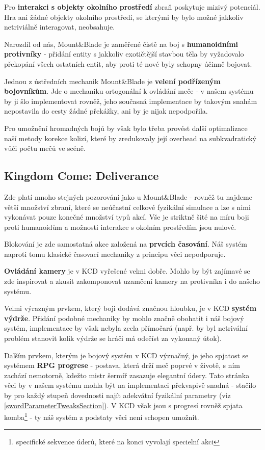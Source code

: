 Pro \textbf{interakci s objekty okolního prostředí} zbraň poskytuje mizivý potenciál. Hra ani žádné objekty okolního prostředí, se kterými by bylo možné jakkoliv netriviálně interagovat, neobsahuje.

Narozdíl od nás, Mount\&Blade je zaměřené čistě na boj s \textbf{humanoidními protivníky} - přidání entity s jakkoliv exotičtější stavbou těla by vyžadovalo překopání všech ostatních entit, aby proti té nové byly schopny účinně bojovat.


Jednou z ústředních mechanik Mount\&Blade je \textbf{velení podřízeným bojovníkům}. Jde o mechaniku ortogonální k ovládání meče - v našem systému by ji šlo implementovat rovněž, jeho současná implementace by takovým snahám nepostavila do cesty žádné překážky, ani by je nijak nepodpořila.

Pro umožnění hromadných bojů by však bylo třeba provést další optimalizace naší metody korekce kolizí, které by zredukovaly její overhead na subkvadratický vůči počtu mečů ve scéně. 




\subsection{Kingdom Come: Deliverance} \label{finalComparisonWithKCD}

Zde platí mnoho stejných pozorování jako u Mount\&Blade - rovněž tu najdeme větší množství zbraní, které se neúčastní celkové fyzikální simulace a lze s nimi vykonávat pouze konečné množství typů akcí. Vše je striktně šité na míru boji proti humanoidům a možnosti interakce s okolním prostředím jsou nulové.

Blokování je zde samostatná akce založená na \textbf{prvcích časování}. Náš systém naproti tomu klasické časovací mechaniky z principu věci nepodporuje.

\textbf{Ovládání kamery} je v \acl{KCD} vyřešené velmi dobře. Mohlo by být zajímavé se zde inspirovat a zkusit zakomponovat uzamčení kamery na protivníka i do našeho systému.

Velmi výrazným prvkem, který boji dodává značnou hloubku, je v \acl{KCD} \textbf{systém výdrže}. Přidání podobné mechaniky by mohlo značně obohatit i náš bojový systém, implementace by však nebyla zcela přímočará (např. by byl netrivální problém stanovit kolik výdrže se hráči má odečíst za vykonaný útok).

Dalším prvkem, kterým je bojový systém v \acl{KCD} význačný, je jeho spjatost se systémem \textbf{\acs{RPG} progrese} - postava, která drží meč poprvé v životě, s ním zachází nemotorně, kdežto mistr šermíř zasazuje elegantní údery. Tato stránka věci by v našem systému mohla být na implementaci překvapivě snadná - stačilo by pro každý stupeň dovednosti najít adekvátní fyzikální parametry (viz \ref{swordParameterTweaksSection}). V \acl{KCD} však jsou s progresí rovněž spjata komba\footnote{specifické sekvence úderů, které na konci vyvolají specielní akci} - ty náš systém z podstaty věci není schopen umožnit.  

